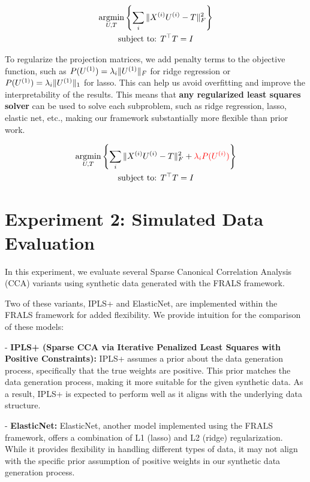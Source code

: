 \begin{gather*}
    \underset{U, T}{\mathrm{argmin}}\left\{\sum_i \|X^{(i)} U^{(i)} - T\|_F^2 \right\}\\
    \text{subject to: } T^\top T = I\\
\end{gather*}

To regularize the projection matrices, we add penalty terms to the objective function, such as \( P(U^{(1)}) = \lambda_i \|U^{(1)}\|_F \) for ridge regression or \( P(U^{(1)}) = \lambda_i \|U^{(1)}\|_1 \) for lasso.
This can help us avoid overfitting and improve the interpretability of the results.
This means that \textbf{any regularized least squares solver} can be used to solve each subproblem, such as ridge regression, lasso, elastic net, etc., making our framework substantially more flexible than prior work.

\begin{gather*}
    \underset{U, T}{\mathrm{argmin}}\left\{\sum_i \|X^{(i)} U^{(i)} - T\|_F^2 + \textcolor{red}{\lambda_i P(U^{(i)})}\right\}\\
    \text{subject to: } T^\top T = I\\
\end{gather*}


\section{Experiment 2: Simulated Data Evaluation}\label{subsec:exp1}

In this experiment, we evaluate several Sparse Canonical Correlation Analysis (CCA) variants using synthetic data generated with the FRALS framework.

Two of these variants, IPLS+ and ElasticNet, are implemented within the FRALS framework for added flexibility.
We provide intuition for the comparison of these models:

- \textbf{IPLS+ (Sparse CCA via Iterative Penalized Least Squares with Positive Constraints):} IPLS+ assumes a prior about the data generation process, specifically that the true weights are positive.
This prior matches the data generation process, making it more suitable for the given synthetic data.
As a result, IPLS+ is expected to perform well as it aligns with the underlying data structure.

- \textbf{ElasticNet:} ElasticNet, another model implemented using the FRALS framework, offers a combination of L1 (lasso) and L2 (ridge) regularization.
While it provides flexibility in handling different types of data, it may not align with the specific prior assumption of positive weights in our synthetic data generation process.

